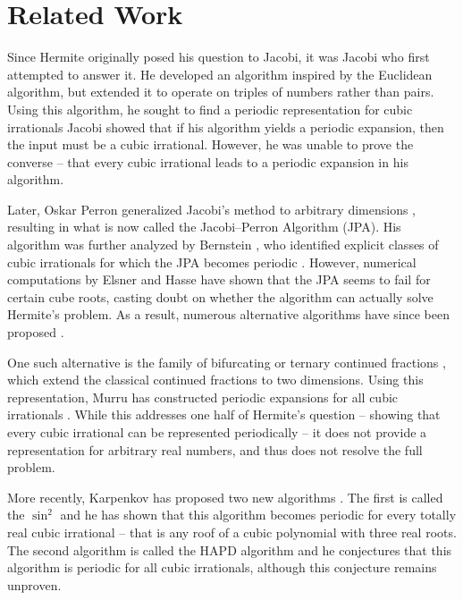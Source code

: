 \section{Related Work}

Since Hermite originally posed his question to Jacobi, it was Jacobi who first attempted to answer it.
He developed an algorithm inspired by the Euclidean algorithm,
but extended it to operate on triples of numbers rather than pairs.
Using this algorithm, he sought to find a periodic representation for cubic irrationals
Jacobi showed that if his algorithm yields a periodic expansion,
then the input must be a cubic irrational.
However, he was unable to prove the converse -- that every cubic irrational leads to a periodic expansion in his algorithm.

Later, Oskar Perron generalized Jacobi's method to arbitrary dimensions \cite{Perron07},
resulting in what is now called the Jacobi–Perron Algorithm (JPA).
His algorithm was further analyzed by Bernstein \cite{Bernstein71},
who identified explicit classes of cubic irrationals for which the JPA
becomes periodic \cite{Bernstein64A, Bernstein65, Bernstein64B}.
However, numerical computations by Elsner and Hasse \cite{Elsner67} have shown
that the JPA seems to fail for certain cube roots,
casting doubt on whether the algorithm can actually solve Hermite’s problem.
As a result, numerous alternative algorithms have since been proposed
\cite{Assaf05, Hendy81, Schweiger00, Schweiger13}.

One such alternative is the family of bifurcating or ternary continued
fractions \cite{Gupta00},
which extend the classical continued fractions to two dimensions.
Using this representation, Murru has constructed periodic expansions for all
cubic irrationals \cite{Murru15}.
While this addresses one half of Hermite’s question --
showing that every cubic irrational can be represented periodically --
it does not provide a representation for arbitrary real numbers,
and thus does not resolve the full problem.

More recently, Karpenkov has proposed two new algorithms \cite{Karpenkov21, Karpenkov24}.
The first is called the $\sin^2$ and he has shown that this algorithm
becomes periodic for every totally real cubic irrational -- that is any roof of
a cubic polynomial with three real roots.
The second algorithm is called the HAPD algorithm \cite{Karpenkov24} and he
conjectures that this algorithm is periodic for all cubic irrationals,
although this conjecture remains unproven.


